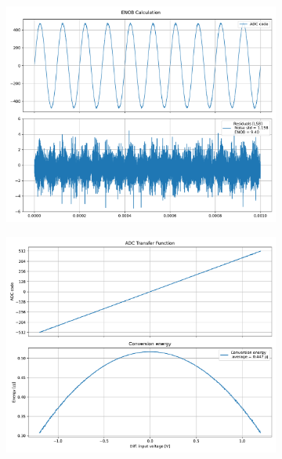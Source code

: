 \documentclass[varwidth]{standalone}
\begin{document}
\begin{figure}
\begin{subfigure}{0.32\textwidth}
    \includegraphics[width=\textwidth]{behavioral_10b_noisy_bincomp_enob.pdf}
\end{subfigure}
\begin{subfigure}{0.32\textwidth}
    \begin{table}
    \let\center\empty
    \let\endcenter\relax
    \centering
    \resizebox{0.3\width}{!}{}
    \end{table}
    \includegraphics[width=\textwidth]{behavioral_10b_noisy_bincomp_energy.pdf}
\end{subfigure}
\end{figure}
\end{document}
